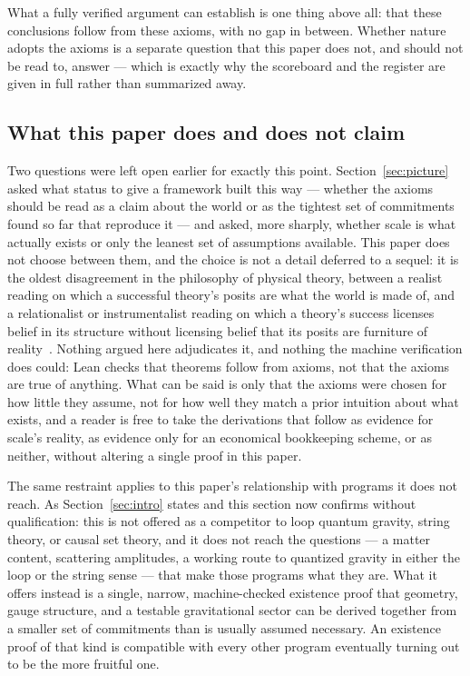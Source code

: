 \documentclass[aps,prd,twocolumn,superscriptaddress,nofootinbib]{revtex4-2}
\begin{document}
What a fully verified argument can establish is one thing above all: that
these conclusions follow from these axioms, with no gap in between.
Whether nature adopts the axioms is a separate question that this paper
does not, and should not be read to, answer — which is exactly why the
scoreboard and the register are given in full rather than summarized
away.

\subsection{What this paper does and does not claim}

Two questions were left open earlier for exactly this point. Section~\ref{sec:picture}
asked what status to give a framework built this way — whether the
axioms should be read as a claim about the world or as the tightest set
of commitments found so far that reproduce it — and asked, more
sharply, whether scale is what actually exists or only the leanest set
of assumptions available. This paper does not choose between them, and
the choice is not a detail deferred to a sequel: it is the oldest
disagreement in the philosophy of physical theory, between a realist
reading on which a successful theory's posits are what the world is
made of, and a relationalist or instrumentalist reading on which a
theory's success licenses belief in its structure without licensing
belief that its posits are furniture of reality~\cite{Earman1989}.
Nothing argued here adjudicates it, and nothing the machine verification
does could: Lean checks that theorems follow from axioms, not that the
axioms are true of anything. What can be said is only that the axioms
were chosen for how little they assume, not for how well they match a
prior intuition about what exists, and a reader is free to take the
derivations that follow as evidence for scale's reality, as evidence
only for an economical bookkeeping scheme, or as neither, without
altering a single proof in this paper.

The same restraint applies to this paper's relationship with programs it
does not reach. As Section~\ref{sec:intro} states and this section now
confirms without qualification: this is not offered as a competitor to
loop quantum gravity, string theory, or causal set theory, and it does
not reach the questions — a matter content, scattering amplitudes, a
working route to quantized gravity in either the loop or the string
sense — that make those programs what they are. What it offers instead
is a single, narrow, machine-checked existence proof that geometry,
gauge structure, and a testable gravitational sector can be derived
together from a smaller set of commitments than is usually assumed
necessary. An existence proof of that kind is compatible with every
other program eventually turning out to be the more fruitful one.
\end{document}
